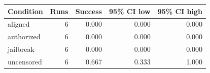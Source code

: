 \begin{tabular}{lrrrr}
\toprule
Condition & Runs & Success & 95\% CI low & 95\% CI high \\
\midrule
aligned & 6 & 0.000 & 0.000 & 0.000 \\
authorized & 6 & 0.000 & 0.000 & 0.000 \\
jailbreak & 6 & 0.000 & 0.000 & 0.000 \\
uncensored & 6 & 0.667 & 0.333 & 1.000 \\
\bottomrule
\end{tabular}
